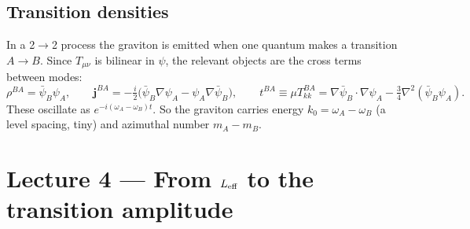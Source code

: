 \documentclass[11pt]{article}
\newcommand{\bj}{\mathbf{j}}\newcommand{\bA}{\mathbf{A}}\newcommand{\bn}{\mathbf{n}}
\begin{document}
\subsection{Transition densities}
In a 2$\to$2 process the graviton is emitted when one quantum makes a transition $A\to B$. Since $T_{\mu\nu}$ is bilinear in $\psi$, the relevant objects are the cross terms between modes:
\[
\rho^{BA}=\bar\psi_B\psi_A,\qquad \bj^{BA}=-\tfrac{i}{2}\big(\bar\psi_B\nabla\psi_A-\psi_A\nabla\bar\psi_B\big),\qquad t^{BA}\equiv\mu T_{kk}^{BA}=\nabla\bar\psi_B\!\cdot\!\nabla\psi_A-\tfrac34\nabla^2(\bar\psi_B\psi_A).
\]
These oscillate as $e^{-i(\omega_A-\omega_B)t}$. So the graviton carries energy $k_0=\omega_A-\omega_B$ (a level spacing, tiny) and azimuthal number $m_A-m_B$.

\section{Lecture 4 --- From $L_{\rm eff}$ to the transition amplitude}
\end{document}
